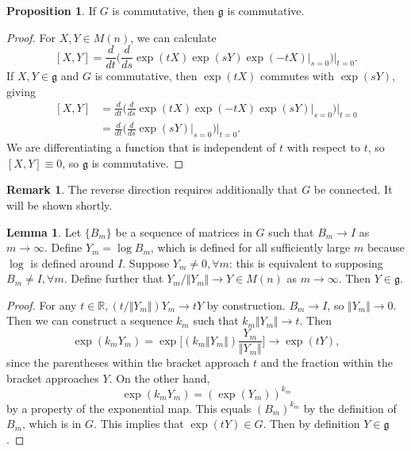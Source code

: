\documentclass[12pt]{article}
\newcommand{\R}{\mathbb{R}}
\newcommand{\g}{\mathfrak{g}}
\newcommand{\V}{\Vert}
\theoremstyle{definition}
\newtheorem{prop}[them]{Proposition}
\theoremstyle{definition}
\theoremstyle{definition}
\newtheorem{lem}[them]{Lemma}
\theoremstyle{definition}
\newtheorem{rmk}[them]{Remark}
\theoremstyle{definition}
\theoremstyle{definition}
\theoremstyle{definition}
\theoremstyle{definition}
\begin{document}
\begin{prop}
    If $G$ is commutative, then $\g$ is commutative.
\end{prop}
\begin{proof}
    For $X, Y \in M(n)$, we can calculate
\[
    [X,Y] = \frac{d}{dt}\Big(\frac{d}{ds}\exp(tX)\exp(sY)\exp(-tX)\Big|_{s=0}
    \Big)\Big|_{t=0}.
\] If $X, Y \in \g$ and $G$ is commutative, then $\exp(tX)$ commutes with $\exp(sY)$, giving 
\[\begin{aligned}
    [X, Y] & =
    \frac{d}{dt}\Big(\frac{d}{ds}\exp(tX)\exp(-tX)\exp(sY)\Big|_{s=0}\Big)\Big|_{t=0} \\
    & = \frac{d}{dt}\Big(\frac{d}{ds}\exp(sY)\Big|_{s=0}\Big)\Big|_{t=0}.
\end{aligned}\] We are differentiating a function that is independent of $t$ with respect to $t$, so $[X,Y] \equiv 0$, so $\g$ is commutative.
\end{proof}

\begin{rmk}
    The reverse direction requires additionally that $G$ be
    connected. It will be shown shortly.
\end{rmk}

\begin{lem}
    Let $\{B_m\}$ be a sequence of matrices in $G$
    such that $B_m \to I$ as $m \to \infty$.
    Define $Y_m = \log B_m$, which is defined for
    all sufficiently large $m$ because $\log$ is
    defined around $I$. Suppose $Y_m \neq 0,
    \forall m$: this is equivalent to supposing
    $B_m \neq I, \forall m$. Define further that
    $Y_m / \V Y_m \V \to Y \in M(n)$ as $m \to
    \infty$. Then $Y \in \g$.
\end{lem}

\begin{proof}
    For any $t \in \R, (t / \V Y_m \V)Y_m \to tY$
    by construction. $B_m \to I$, so $\V Y_m \V
    \to 0$. Then we can construct a sequence $k_m$
    such that $k_m \V Y_m \V \to t$. Then
\[\exp(k_m Y_m) = \exp\Big[(k_m \V Y_m \V)
\frac{Y_m}{\V Y_m \V} \Big] \to \exp(tY),\] since
the parentheses within the bracket approach $t$
and the fraction within the bracket approaches $Y$.
On the other hand, \[\exp(k_m Y_m) =
{(\exp(Y_m))}^{k_m}\] by a property of the
exponential map. This equals ${(B_m)}^{k_m}$ by
the definition of $B_m$, which is in $G$. This
implies that $\exp(tY) \in G$. Then by definition $Y
\in \g$. 
\end{proof}
\end{document}
